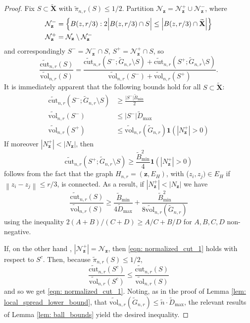\documentclass{article}
\newcommand{\set}[1]{\left\{#1\right\}}
\newcommand{\vol}{\mathrm{vol}}
\newcommand{\abs}[1]{\left \lvert #1 \right \rvert}
\newcommand{\norm}[1]{\left\lVert#1\right\rVert}
\newcommand{\1}{\mathbf{1}}
\newcommand{\cut}{\mathrm{cut}}
\newcommand{\zbf}{\mathbf{z}}
\newcommand{\Xbf}{\mathbf{X}}
\newcommand{\wn}{\widetilde{n}}
\newcommand{\wX}{\widetilde{\Xbf}}
\theoremstyle{aldenthm}
\begin{document}
\begin{proof}
	Fix $S \subset \wX$ with $\widetilde{\pi}_{n,r}(S) \leq 1/2$. Partition $\mathcal{N}_{\zbf} = \mathcal{N}_{\zbf}^+ \cup \mathcal{N}_{\zbf}^-$, where
	\begin{align*}
	\mathcal{N}_{\zbf}^- & = \set{B(z,r/3): 2 \Bigl\vert B(z,r/3) \cap S\Bigr\vert \leq \abs{B(z,r/3) \cap \wX} } \\
	\mathcal{N}_{\zbf}^+ & = \mathcal{N}_{\zbf} \setminus \mathcal{N}_{\zbf}^-
	\end{align*}
	and correspondingly $S^- = \mathcal{N}_{\zbf}^- \cap S$, $S^+ = \mathcal{N}_{\zbf}^+ \cap S$, so
	\begin{equation*}
	\frac{\widetilde{\cut}_{n,r}(S)}{\widetilde{\vol}_{n,r}(S)} = \frac{\widetilde{\cut}_{n,r}(S^-; \widetilde{G}_{n,r} \setminus S) + \widetilde{\cut}_{n,r}(S^+; \widetilde{G}_{n,r} \setminus S)}{\widetilde{\vol}_{n,r}(S^-) + \widetilde{\vol}_{n,r}(S^+)}.
	\end{equation*}
	It is immediately apparent that the following bounds hold for all $S \subset \wX$:
	\begin{align*}
	\widetilde{\cut}_{n,r}(S^-; \widetilde{G}_{n,r} \setminus S) & \geq \frac{\abs{S^-} \widetilde{B}_{\min}}{2}\\
	\widetilde{\vol}_{n,r}(S^-) & \leq \abs{S^-} \widetilde{D}_{\max} \\
	\widetilde{\vol}_{n,r}(S^+) & \leq \widetilde{\vol}_{n,r}(\widetilde{G}_{n,r}) \1(\abs{N_{\zbf}^+} > 0 )
	\end{align*}
	If moreover $\abs{N_{\zbf}^+} < \abs{N_{\zbf}}$, then 
	\begin{equation*}
	\widetilde{\cut}_{n,r}(S^+; \widetilde{G}_{n,r} \setminus S) \geq \frac{\widetilde{B}_{\min}^2}{4} \1(\abs{N_{\zbf}^+} > 0)
	\end{equation*}
	follows from the fact that the graph $H_{n,r} = (\zbf, E_H)$, with ($z_i, z_j) \in E_H$ if $\norm{z_i - z_j} \leq r/3$, is connected. As a result, if $\abs{N_{\zbf}^+} < \abs{N_{\zbf}}$ we have
	\begin{equation}
	\label{eqn: normalized_cut_1}
	\frac{\widetilde{\cut}_{n,r}(S)}{\widetilde{\vol}_{n,r}(S)} \geq \frac{ \widetilde{B}_{\min}}{4\widetilde{D}_{\max}} +  \frac{\widetilde{B}_{\min}^2}{8 \widetilde{\vol}_{n,r}(\widetilde{G}_{n,r})}
	\end{equation}
	using the inequality $2(A + B)/ (C + D) \geq A/C + B/D$ for $A,B,C,D$ non-negative.
	
	If, on the other hand , $\abs{\mathcal{N}_{\zbf}^+} = \mathcal{N}_{\zbf}$, then \eqref{eqn: normalized_cut_1} holds with respect to $S^c$. Then, because $\widetilde{\pi}_{n,r}(S) \leq 1/2$, 
	\begin{equation*}
	\frac{\widetilde{\cut}_{n,r}(S^c)}{\widetilde{\vol}_{n,r}(S^c)} \leq \frac{\widetilde{\cut}_{n,r}(S)}{\widetilde{\vol}_{n,r}(S)}
	\end{equation*}
	and so we get \eqref{eqn: normalized_cut_1}. Noting, as in the proof of Lemma \ref{lem: local_spread_lower_bound}, that  $\widetilde{\vol}_{n,r}(\widetilde{G}_{n,r}) \leq \wn \cdot \widetilde{D}_{\max}$, the relevant results of Lemma \ref{lem: ball_bounds} yield the desired inequality. 
\end{proof}
\end{document}
